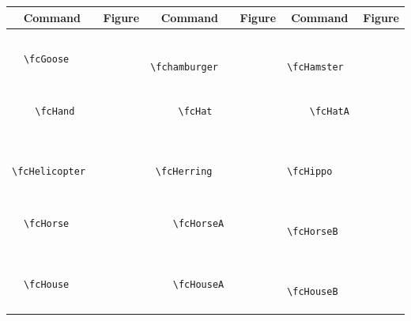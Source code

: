 \documentclass[x11names]{article}
\begin{document}
\begin{table}[H]\centering\begin{tabular}{|c|c|c|c|c|c|}\hline{\bf Command} & {\bf Figure} & {\bf Command} & {\bf Figure} & {\bf Command} & {\bf Figure}\\	\hline	&\multirow{5}{*}{	\fcGoose	[scale=0.64]} & &\multirow{5}{*}{	\fchamburger	[scale=0.16]} & &\multirow{5}{*}{	\fcHamster	[scale=0.16]}\\	& & & & & \\	& & & & & \\	\verb|	\fcGoose	| & & \verb|	\fchamburger	| & & \verb|	\fcHamster	| & \\	& & & & & \\	& & & & & \\	& & & & & \\	\hline									
		&\multirow{5}{*}{	\fcHand	[scale=0.09]} & &\multirow{5}{*}{	\fcHat	[scale=0.64]} & &\multirow{5}{*}{	\fcHatA	[scale=0.64]}\\	& & & & & \\	& & & & & \\	\verb|	\fcHand	| & & \verb|	\fcHat	| & & \verb|	\fcHatA	| & \\	& & & & & \\	& & & & & \\	& & & & & \\	\hline									
		&\multirow{5}{*}{	\fcHelicopter	[scale=0.16]} & &\multirow{5}{*}{	\fcHerring	[scale=0.16]} & &\multirow{5}{*}{	\fcHippo	[scale=0.16]}\\	& & & & & \\	& & & & & \\	\verb|	\fcHelicopter	| & & \verb|	\fcHerring	| & & \verb|	\fcHippo	| & \\	& & & & & \\	& & & & & \\	& & & & & \\	\hline									
		&\multirow{5}{*}{	\fcHorse	[scale=0.64]} & &\multirow{5}{*}{	\fcHorseA	[scale=0.09]} & &\multirow{5}{*}{	\fcHorseB	[scale=0.09]}\\	& & & & & \\	& & & & & \\	\verb|	\fcHorse	| & & \verb|	\fcHorseA	| & & \verb|	\fcHorseB	| & \\	& & & & & \\	& & & & & \\	& & & & & \\	\hline									
		&\multirow{5}{*}{	\fcHouse	[scale=0.64]} & &\multirow{5}{*}{	\fcHouseA	[scale=0.64]} & &\multirow{5}{*}{	\fcHouseB	[scale=0.16]}\\	& & & & & \\	& & & & & \\	\verb|	\fcHouse	| & & \verb|	\fcHouseA	| & & \verb|	\fcHouseB	| & \\	& & & & & \\	& & & & & \\	& & & & & \\	\hline									

\end{tabular}
\end{table}
\end{document}
